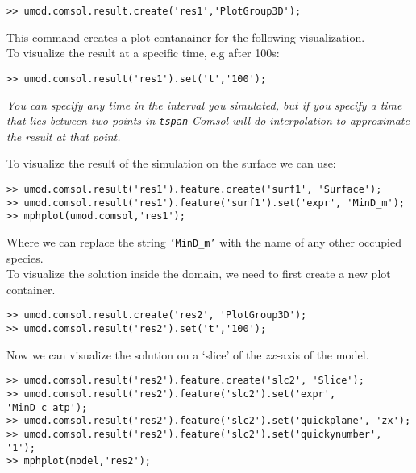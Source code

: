 \begin{verbatim}
>> umod.comsol.result.create('res1','PlotGroup3D');
\end{verbatim} 

This command creates a plot-contanainer for the following visualization. \\

To visualize the result at a specific time, e.g after 100s:

\begin{verbatim}
>> umod.comsol.result('res1').set('t','100');
\end{verbatim}

 {\color{red}{\bf {!}}} \emph{You can specify any time in the interval
   you simulated, but if you specify a time that lies between two
   points in \texttt{tspan} Comsol will do interpolation to
   approximate the result at that point.} \\

\noindent

To visualize the result of the simulation on the surface we can use:

\begin{verbatim}
>> umod.comsol.result('res1').feature.create('surf1', 'Surface');
>> umod.comsol.result('res1').feature('surf1').set('expr', 'MinD_m');
>> mphplot(umod.comsol,'res1');
\end{verbatim}

Where we can replace the string \texttt{'MinD\_m'} with the name of any other occupied species. \\

To visualize the solution inside the domain, we need to first create a new plot container.

\begin{verbatim}
>> umod.comsol.result.create('res2', 'PlotGroup3D');
>> umod.comsol.result('res2').set('t','100');
\end{verbatim} 

Now we can visualize the solution on a `slice' of the $zx$-axis of the model.

\begin{verbatim}
>> umod.comsol.result('res2').feature.create('slc2', 'Slice');
>> umod.comsol.result('res2').feature('slc2').set('expr', 'MinD_c_atp');
>> umod.comsol.result('res2').feature('slc2').set('quickplane', 'zx');
>> umod.comsol.result('res2').feature('slc2').set('quickynumber', '1');
>> mphplot(model,'res2');
\end{verbatim} 

